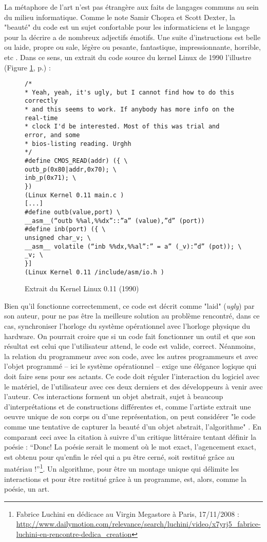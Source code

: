 La métaphore de l'art n'est pas étrangère aux faits de langages communs au sein du milieu informatique. Comme le note Samir Chopra et Scott Dexter, la "beauté" du code est un sujet confortable pour les informaticiens et le langage pour la décrire a de nombreux adjectifs émotifs. Une suite d'instructions est belle ou laide, propre ou sale, légère ou pesante, fantastique, impressionnante, horrible, etc \citep{Chopra+Dexter2007}. Dans ce sens, un extrait du code source du kernel Linux de 1990 l'illustre (Figure \ref{fig2.2}, p.\pageref{fig2.2}) :

\begin{figure}[h]
\caption{Extrait du Kernel Linux 0.11 (1990)} \label{fig2.2}
{\footnotesize
\begin{verbatim}
/*
* Yeah, yeah, it's ugly, but I cannot find how to do this correctly
* and this seems to work. If anybody has more info on the real-time
* clock I'd be interested. Most of this was trial and error, and some
* bios-listing reading. Urghh
*/
#define CMOS_READ(addr) ({ \
outb_p(0x80|addr,0x70); \
inb_p(0x71); \
})
(Linux Kernel 0.11 main.c )
[...]
#define outb(value,port) \
__asm__(“outb %%al,%%dx”::”a” (value),”d” (port))
#define inb(port) ({ \
unsigned char_v; \
__asm__ volatile (“inb %%dx,%%al”:” = a” (_v):”d” (pot)); \
_v; \
}]
(Linux Kernel 0.11 /include/asm/io.h )
\end{verbatim}
}
\end{figure}

Bien qu'il fonctionne correctemment, ce code est décrit comme "laid" (\emph{ugly}) par son auteur, pour ne pas être la meilleure solution au problème rencontré, dans ce cas, synchroniser l'horloge du système opérationnel avec l'horloge physique du hardware. On pourrait croire que si un code fait fonctionner un outil et que son résultat est celui que l'utilisateur attend, le code est valide, correct. Néanmoins, la relation du programmeur avec son code, avec les autres programmeurs et avec l'objet programmé -- ici le système opérationnel -- exige une élégance logique qui doit faire sens pour ses actants. Ce code doit réguler l'interaction du logiciel avec le matériel, de l'utilisateur avec ces deux derniers et des développeurs à venir avec l'auteur. Ces interactions forment un objet abstrait, sujet à beaucoup d'interprétations et de constructions différentes et, comme l'artiste extrait une oeuvre unique de son corps ou d'une représentation, on peut considérer "le code comme une tentative de capturer la beauté d'un objet abstrait, l'algorithme" \citep[p.77]{Chopra+Dexter2007}. En comparant ceci avec la citation à suivre d'un critique littéraire tentant définir la poésie : “Donc! La poésie serait le moment où le mot exact, l'agencement exact, est obtenu pour qu'enfin le réel qui a pu être cerné, soit restitué grâce au matériau !”\footnote{Fabrice Luchini en dédicace au Virgin Megastore à Paris, 17/11/2008 : \url{http://www.dailymotion.com/relevance/search/luchini/video/x7yrj5_fabrice-luchini-en-rencontre-dedica_creation}}. Un algorithme, pour être un montage unique qui délimite les interactions et pour être restitué grâce à un programme, est, alors, comme la poésie, un art.


